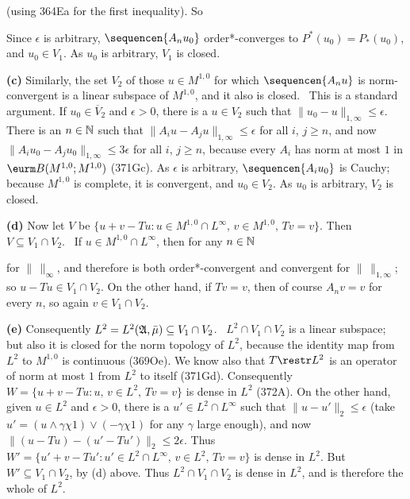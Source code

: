 {\noindent (using 364Ea for the first inequality).   So


\noindent Since $\epsilon$ is arbitrary, $\sequencen{A_nu_0}$
order*-converges to $P^*(u_0)=P_*(u_0)$, and $u_0\in V_1$.   As $u_0$ is
arbitrary, $V_1$ is closed.\   \Qed

\medskip


{\bf (c)} Similarly, the set $V_2$ of those $u\in M^{1,0}$ for which
$\sequencen{A_nu}$ is norm-convergent is a linear subspace of $M^{1,0}$,
and it also is closed.   \Prf\ This is a standard argument.   If
$u_0\in\overline{V}_2$ and $\epsilon>0$, there is a $u\in V_2$ such that
$\|u_0-u\|_{1,\infty}\le\epsilon$.   There is an $n\in\Bbb N$ such that
$\|A_iu-A_ju\|_{1,\infty}\le\epsilon$ for all $i$, $j\ge n$, and now
$\|A_iu_0-A_ju_0\|_{1,\infty}\le 3\epsilon$ for all $i$, $j\ge n$,
because every $A_i$ has norm at most $1$ in $\eurm B(M^{1,0};M^{1,0})$
(371Gc).   As $\epsilon$ is arbitrary,
$\sequencen{A_iu_0}$ is Cauchy;  because $M^{1,0}$ is complete,
it is convergent, and $u_0\in V_2$.   As $u_0$ is arbitrary, $V_2$ is
closed.\   \Qed

\medskip

{\bf (d)} Now let $V$ be
$\{u+v-Tu:u\in M^{1,0}\cap L^{\infty},\,v\in M^{1,0},\,Tv=v\}$.   Then
$V\subseteq V_1\cap V_2$.   \Prf\ If $u\in M^{1,0}\cap L^{\infty}$, then
for any $n\in\Bbb N$


\noindent for $\|\,\|_{\infty}$, and therefore is both
order*-convergent and convergent for
$\|\,\|_{1,\infty}$;  so $u-Tu\in V_1\cap V_2$.   On the other hand, if
$Tv=v$, then of course $A_nv=v$ for every $n$, so again
$v\in V_1\cap V_2$.\   \Qed

\medskip

{\bf (e)} Consequently $L^2=L^2(\frak A,\bar\mu)\subseteq V_1\cap V_2$.
\Prf\ $L^2\cap V_1\cap V_2$ is a linear subspace;  but also it is closed
for the norm topology of $L^2$, because the identity map from $L^2$ to
$M^{1,0}$ is continuous (369Oe).   We know also that $T\restr L^2$
is an operator of norm at
most $1$ from $L^2$ to itself (371Gd).   Consequently
$W=\{u+v-Tu:u,\,v\in L^2,\,Tv=v\}$ is dense in $L^2$ (372A).   On the
other hand, given $u\in L^2$ and $\epsilon>0$, there is a $u'\in L^2\cap
L^{\infty}$ such that $\|u-u'\|_2\le\epsilon$ (take
$u'=(u\wedge\gamma\chi 1)\vee(-\gamma\chi 1)$ for any $\gamma$ large
enough), and now $\|(u-Tu)-(u'-Tu')\|_2\le 2\epsilon$.   Thus
$W'=\{u'+v-Tu':u'\in L^2\cap L^{\infty},\,v\in L^2,\,Tv=v\}$ is dense in
$L^2$.   But $W'\subseteq V_1\cap V_2$, by (d) above.   Thus
$L^2\cap V_1\cap V_2$ is dense in $L^2$, and is therefore the whole of
$L^2$.\
\Qed

}
